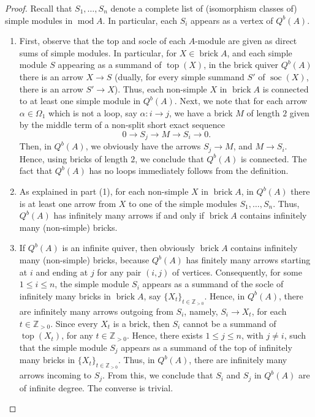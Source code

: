 \documentclass{amsart}
\theoremstyle{thmstyle}
\theoremstyle{exstyle}
\theoremstyle{defstyle}
\theoremstyle{remstyle}
\theoremstyle{remstyle}
\DeclareMathOperator*{\modu}{mod}
\DeclareMathOperator*{\brick}{brick}
\DeclareMathOperator*{\soc}{soc}
\DeclareMathOperator*{\topm}{top}
\begin{document}
\begin{proof} 
Recall that $S_1, \ldots, S_n$ denote a complete list of (isomorphism classes of) simple modules in $\modu A$. In particular, each $S_i$ appears as a vertex of $Q^b(A)$. 
\begin{enumerate}
    \item First, observe that the top and socle of each $A$-module are given as direct sums of simple modules. In particular, for $X\in \brick A$, and each simple module $S$ appearing as a summand of $\topm(X)$, in the brick quiver $Q^b(A)$ there is an arrow $X \to S$ (dually, for every simple summand $S'$ of $\soc(X)$, there is an arrow $S' \to X$). Thus, each non-simple $X$ in $\brick A$ is connected to at least one simple module in $Q^b(A)$. 
    Next, we note that for each arrow $\alpha \in \Omega_1$ which is not a loop, say $\alpha: i \to j$, we have a brick $M$ of length $2$ given by the middle term of a non-split short exact sequence
    $$0 \to S_j \to M \to S_i \to 0.$$ Then, in $Q^b(A)$, we obviously have the arrows $S_j \to M$, and $M \to S_i$. Hence, using bricks of length $2$, we conclude that $Q^b(A)$ is connected. 
    The fact that $Q^b(A)$ has no loops immediately follows from the definition.

    \item As explained in part (1), for each non-simple $X$ in $\brick A$, in $Q^b(A)$ there is at least one arrow from $X$ to one of the simple modules $S_1, \ldots, S_n$. Thus, $Q^b(A)$ has infinitely many arrows if and only if $\brick A$ contains infinitely many (non-simple) bricks. 

    \item If $Q^b(A)$ is an infinite quiver, then obviously $\brick A$ contains infinitely many (non-simple) bricks, because $Q^b(A)$ has finitely many arrows starting at $i$ and ending at $j$ for any pair $(i,j)$ of vertices.  Consequently, for some $1\leq i \leq n$, the simple module $S_i$ appears as a summand of the socle of infinitely many bricks in $\brick A$, say $\{X_t\}_{t\in \mathbb{Z}_{>0}}$. Hence, in $Q^b(A)$, there are infinitely many arrows outgoing from $S_i$, namely, $S_i \to X_t$, for each ${t\in \mathbb{Z}_{>0}}$. Since every $X_t$ is a brick, then $S_i$ cannot be a summand of $\topm(X_t)$, for any ${t\in \mathbb{Z}_{>0}}$. Hence, there exists $1\leq j \leq n$, with $j\neq i$, such that the simple module $S_j$ appears as a summand of the top of infinitely many bricks in $\{X_t\}_{t\in \mathbb{Z}_{>0}}$. Thus, in $Q^b(A)$, there are infinitely many arrows incoming to $S_j$. From this, we conclude that $S_i$ and $S_j$ in  $Q^b(A)$ are of infinite degree. The converse is trivial.


\end{enumerate}
\end{proof}
\end{document}
